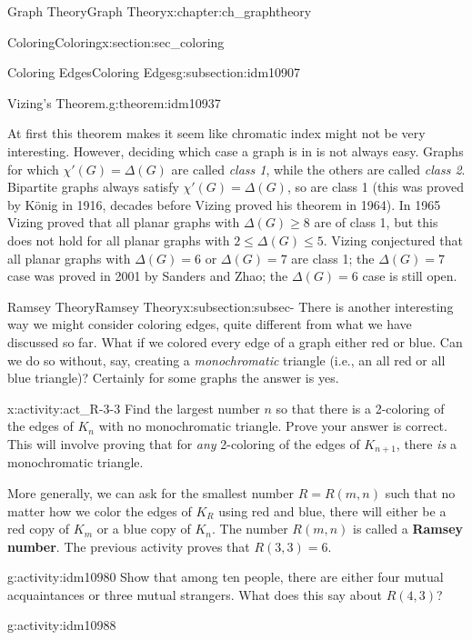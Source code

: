 \documentclass[oneside,10pt,]{book}
\newcommand{\terminology}[1]{\textbf{#1}}
\numberwithin{equation}{chapter}
\begin{document}
\begin{chapterptx}{Graph Theory}{}{Graph Theory}{}{}{x:chapter:ch_graphtheory}
\begin{sectionptx}{Coloring}{}{Coloring}{}{}{x:section:sec_coloring}
\begin{subsectionptx}{Coloring Edges}{}{Coloring Edges}{}{}{g:subsection:idm10907}
\begin{theorem}{Vizing's Theorem.}{}{g:theorem:idm10937}
\end{theorem}
At first this theorem makes it seem like chromatic index might not be very interesting. However, deciding which case a graph is in is not always easy. Graphs for which \(\chi'(G) = \Delta(G)\) are called \emph{class 1}, while the others are called \emph{class 2}. Bipartite graphs always satisfy \(\chi'(G) = \Delta(G)\), so are class 1 (this was proved by König in 1916, decades before Vizing proved his theorem in 1964). In 1965 Vizing proved that all planar graphs with \(\Delta(G) \ge 8\) are of class 1, but this does not hold for all planar graphs with \(2 \le \Delta(G) \le 5\). Vizing conjectured that all planar graphs with \(\Delta(G) = 6\) or \(\Delta(G) = 7\) are class 1; the \(\Delta(G) = 7\) case was proved in 2001 by Sanders and Zhao; the \(\Delta(G) = 6\) case is still open.%
\end{subsectionptx}
%
%
\typeout{************************************************}
\typeout{************************************************}
%
\begin{subsectionptx}{Ramsey Theory}{}{Ramsey Theory}{}{}{x:subsection:subsec-}
There is another interesting way we might consider coloring edges, quite different from what we have discussed so far. What if we colored every edge of a graph either red or blue. Can we do so without, say, creating a \emph{monochromatic} triangle (i.e., an all red or all blue triangle)? Certainly for some graphs the answer is yes.%
\begin{activity}{}{x:activity:act_R-3-3}%
Find the largest number \(n\) so that there is a 2-coloring of the edges of \(K_n\) with no monochromatic triangle.  Prove your answer is correct.  This will involve proving that for \emph{any} 2-coloring of the edges of \(K_{n+1}\), there \emph{is} a monochromatic triangle.%
\end{activity}
More generally, we can ask for the smallest number \(R = R(m,n)\) such that no matter how we color the edges of \(K_R\) using red and blue, there will either be a red copy of \(K_m\) or a blue copy of \(K_n\).  The number \(R(m,n)\) is called a \terminology{Ramsey number}.  The previous activity proves that \(R(3,3) = 6\).%
\begin{activity}{}{g:activity:idm10980}%
Show that among ten people, there are either four mutual acquaintances or three mutual strangers.  What does this say about \(R(4,3)\)?%
\end{activity}
\begin{activity}{}{g:activity:idm10988}%

\end{activity}
\end{subsectionptx}
\end{sectionptx}
\end{chapterptx}
\end{document}
